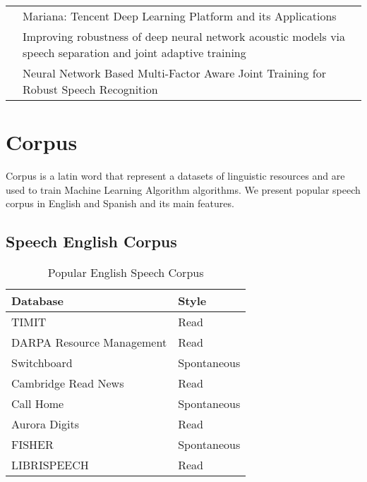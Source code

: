 \begin{landscape}
\begin{table}
\begin{tabular}{|l|l|}
& \multicolumn{1}{l}{Mariana: Tencent Deep Learning Platform and its Applications \cite{Zou2014Mariana:Applications}} \\\cline{2-2}
& \multicolumn{1}{l}{Improving robustness of deep neural network acoustic models via speech separation and joint adaptive training\cite{Narayanan2014ImprovingTraining}}  \\\cline{2-2}
& \multicolumn{1}{l}{Neural Network Based Multi-Factor Aware Joint Training for Robust Speech Recognition \cite{Qian2016NeuralRecognition}} \\\cline{1-2}

\end{tabular}
\end{table}
\end{landscape}

%  
\section{Corpus}
Corpus is a latin word that represent a datasets of linguistic resources and are used to train Machine Learning Algorithm algorithms. We present popular speech corpus in English and Spanish and its main features.
\subsection{Speech English Corpus }
\begin{table}
\centering
\caption{Popular English Speech Corpus}
\label{tab2}
\begin{tabular}{|l|l|}
\hline
Database & Style\\
\hline
TIMIT \cite{PriceTheRecognition} & Read  \\
\hline
DARPA Resource Management \cite{Lucke1992ExpandingCorpus} & Read  \\
\hline
Switchboard \cite{Godfrey1992SWITCHBOARD:Development} & Spontaneous \\
\hline
Cambridge Read News \cite{RobinsonWSJCAM0:RECOGNITION} & Read  \\
\hline
Call Home \cite{Fu-HuaLiuSpeechCorpus} & Spontaneous  \\
\hline
Aurora Digits \cite{EvansEfficientCorpus} & Read \\
\hline
FISHER \cite{CieriTheSpeech-to-Text} & Spontaneous \\
\hline
LIBRISPEECH \cite{PanayotovLIBRISPEECH:BOOKS} & Read \\
\hline
\end{tabular}
\end{table}


